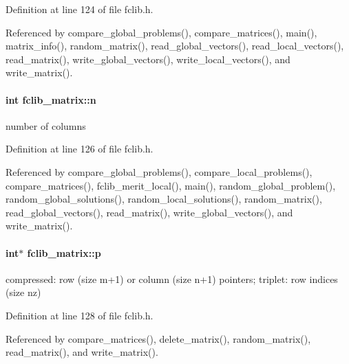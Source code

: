 Definition at line 124 of file fclib.\+h.



Referenced by compare\+\_\+global\+\_\+problems(), compare\+\_\+matrices(), main(), matrix\+\_\+info(), random\+\_\+matrix(), read\+\_\+global\+\_\+vectors(), read\+\_\+local\+\_\+vectors(), read\+\_\+matrix(), write\+\_\+global\+\_\+vectors(), write\+\_\+local\+\_\+vectors(), and write\+\_\+matrix().

\hypertarget{structfclib__matrix_ace0c395ca5da8a4bcc4958a29895c639}{}
\paragraph[{n}]{\setlength{\rightskip}{0pt plus 5cm}int fclib\+\_\+matrix\+::n}\label{structfclib__matrix_ace0c395ca5da8a4bcc4958a29895c639}


number of columns 



Definition at line 126 of file fclib.\+h.



Referenced by compare\+\_\+global\+\_\+problems(), compare\+\_\+local\+\_\+problems(), compare\+\_\+matrices(), fclib\+\_\+merit\+\_\+local(), main(), random\+\_\+global\+\_\+problem(), random\+\_\+global\+\_\+solutions(), random\+\_\+local\+\_\+solutions(), random\+\_\+matrix(), read\+\_\+global\+\_\+vectors(), read\+\_\+matrix(), write\+\_\+global\+\_\+vectors(), and write\+\_\+matrix().

\hypertarget{structfclib__matrix_ace167d937e3c1bb2558e264aefada841}{}
\paragraph[{p}]{\setlength{\rightskip}{0pt plus 5cm}int$\ast$ fclib\+\_\+matrix\+::p}\label{structfclib__matrix_ace167d937e3c1bb2558e264aefada841}


compressed\+: row (size m+1) or column (size n+1) pointers; triplet\+: row indices (size nz) 



Definition at line 128 of file fclib.\+h.



Referenced by compare\+\_\+matrices(), delete\+\_\+matrix(), random\+\_\+matrix(), read\+\_\+matrix(), and write\+\_\+matrix().

